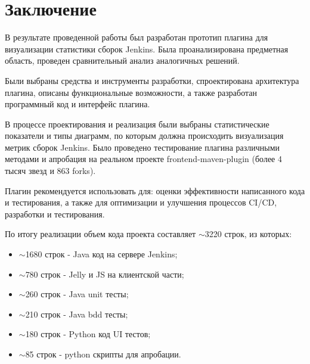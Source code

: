 \chapter*{Заключение} \label{ch-conclusion}

В результате проведенной работы был разработан прототип плагина для визуализации статистики сборок Jenkins. Была проанализирована предметная область, проведен сравнительный анализ аналогичных решений.

Были выбраны средства и инструменты разработки, спроектирована архитектура плагина, описаны функциональные возможности, а также разработан программный код и интерфейс плагина.

В процессе проектирования и реализация были выбраны статистические показатели и типы диаграмм, по которым должна происходить визуализация метрик сборок Jenkins. Было проведено тестирование плагина различными методами и апробация на реальном проекте frontend-maven-plugin (более 4 тысяч звезд и 863 forks).

Плагин рекомендуется использовать для: оценки эффективности написанного кода и тестирования, а также для оптимизации и улучшения процессов CI/CD, разработки и тестирования.

По итогу реализации объем кода проекта составляет $\sim$3220 строк, из которых:

\begin{itemize}
	\item $\sim$1680 строк  - Java код на сервере Jenkins;
	\item $\sim$780 строк - Jelly и JS на клиентской части;
	\item $\sim$260 строк - Java unit тесты;
	\item $\sim$210 строк - Java bdd тесты;
	\item $\sim$180 строк - Python код UI тестов;
	\item $\sim$85 строк - python скрипты для апробации.
\end{itemize}
